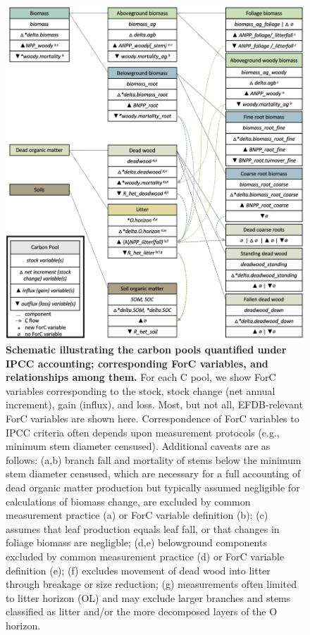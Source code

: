 \documentclass[, manuscript]{copernicus}
\begin{document}
\begin{figure}
\includegraphics[width=14cm]{figures_tables/C_variable_mapping} \caption{\textbf{Schematic illustrating the carbon pools quantified under IPCC accounting; corresponding ForC variables, and relationships among them.} For each C pool, we show ForC variables corresponding to the stock, stock change (net annual increment), gain (influx), and loss. Most, but not all, EFDB-relevant ForC variables are shown here. Correspondence of ForC variables to IPCC criteria often depends upon measurement protocols (e.g., minimum stem diameter censused). Additional caveats are as follows: (a,b) branch fall and mortality of stems below the minimum stem diameter censused, which are necessary for a full accounting of dead organic matter production but typically assumed negligible for calculations of biomass change, are excluded by common measurement practice (a) or ForC variable definition (b); (c) assumes that leaf production equals leaf fall, or that changes in foliage biomass are negligble; (d,e) belowground components excluded by common measurement practice (d) or ForC variable definition (e); (f) excludes movement of dead wood into litter through breakage or size reduction; (g) measurements often limited to litter horizon (OL) and may exclude larger branches and stems classified as litter and/or the more decomposed layers of the O horizon.}\label{fig:fig_variable_mapping}
\end{figure}
\end{document}

